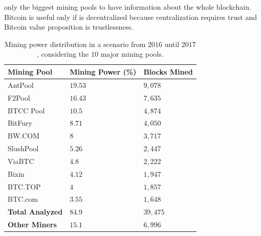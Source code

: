 \documentclass[USenglish]{uit-thesis}
\begin{document}
only the biggest mining pools to have information
about the whole blockchain. Bitcoin is useful only if is decentralized because
centralization requires trust and Bitcoin value proposition is trustlessness.
\begin{table}
	\centering
	\caption{Mining power distribution in a scenario from $2016$ until $2017$,
		considering the $10$ major mining pools.}
	\label{tab:miner_share_2017}
	\begin{tabular}{|p{3.3cm}|p{3.3cm}|p{3.3cm}|} \hline
		\textbf{Mining Pool}&\textbf{Mining Power (\%)}& \textbf{Blocks Mined}\\
		\hline
		\rowcolor{AntPool}
		AntPool&$19.53$&$9,078$\\
		\hline
		\rowcolor{F2Pool}
		F2Pool&$16.43$&$7,635$\\
		\hline
		\rowcolor{BTCC Pool}
		BTCC Pool&$10.5$&$4,874$\\
		\hline
		\rowcolor{BitFury}
		BitFury&$8.71$&$4,050$\\
		\hline
		\rowcolor{BW.COM}
		BW.COM&$8$&$3,717$\\
		\hline
		\rowcolor{SlushPool}
		SlushPool&$5.26$&$2,447$\\
		\hline
		ViaBTC&$4.8$&$2,222$\\
		\hline
		Bixin&$4.12$&$1,947$\\
		\hline
		BTC.TOP&$4$&$1,857$\\
		\hline
		BTC.com&$3.55$&$1,648$\\
		\hline
		\rowcolor{TablesColor}
		\textbf{Total Analyzed}&$84.9$&$39,475$\\
		\hline
		\textbf{Other Miners}&$15.1$&$6,996$\\
		\hline
	\end{tabular}
\end{table}
\end{document}
